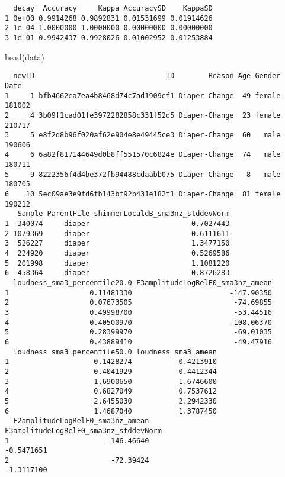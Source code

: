 \documentclass[
  letterpaper,
  DIV=11,
  numbers=noendperiod]{scrartcl}
\newenvironment{Shaded}{\begin{snugshade}}{\end{snugshade}}
\newcommand{\FunctionTok}[1]{\textcolor[rgb]{0.28,0.35,0.67}{#1}}
\newcommand{\NormalTok}[1]{\textcolor[rgb]{0.00,0.23,0.31}{#1}}
\begin{document}
\begin{verbatim}
  decay  Accuracy     Kappa AccuracySD    KappaSD
1 0e+00 0.9914268 0.9892831 0.01531699 0.01914626
2 1e-04 1.0000000 1.0000000 0.00000000 0.00000000
3 1e-01 0.9942437 0.9928026 0.01002952 0.01253884
\end{verbatim}

\begin{Shaded}
\begin{Highlighting}[]
\FunctionTok{head}\NormalTok{(data)}
\end{Highlighting}
\end{Shaded}

\begin{verbatim}
  newID                               ID        Reason Age Gender   Date
1     1 bfb4662ea7ea4b8468d74c7ad1909ef1 Diaper-Change  49 female 181002
2     4 3b09f1cad01fe3972282858c331f52d5 Diaper-Change  23 female 210717
3     5 e8f2d8b96f020af62e904e8e49445ce3 Diaper-Change  60   male 190606
4     6 6a82f817144649d0b8ff551570c6824e Diaper-Change  74   male 180711
5     9 8222356f4d4be372fb94488cdaabb075 Diaper-Change   8   male 180705
6    10 5ec09ae3e9fd6fb143bf92b431e182f1 Diaper-Change  81 female 190212
   Sample ParentFile shimmerLocaldB_sma3nz_stddevNorm
1  340074     diaper                        0.7027443
2 1079369     diaper                        0.6111611
3  526227     diaper                        1.3477150
4  224920     diaper                        0.5269586
5  201998     diaper                        1.1081220
6  458364     diaper                        0.8726283
  loudness_sma3_percentile20.0 F3amplitudeLogRelF0_sma3nz_amean
1                   0.11481330                       -147.90350
2                   0.07673505                        -74.69855
3                   0.49998700                        -53.44516
4                   0.40500970                       -108.06370
5                   0.28399970                        -69.01035
6                   0.43889410                        -49.47916
  loudness_sma3_percentile50.0 loudness_sma3_amean
1                    0.1428274           0.4213910
2                    0.4041929           0.4412344
3                    1.6900650           1.6746600
4                    0.6827049           0.7537612
5                    2.6455030           2.2942330
6                    1.4687040           1.3787450
  F2amplitudeLogRelF0_sma3nz_amean F3amplitudeLogRelF0_sma3nz_stddevNorm
1                       -146.46640                            -0.5471651
2                        -72.39424                            -1.3117100

\end{verbatim}
\end{document}
